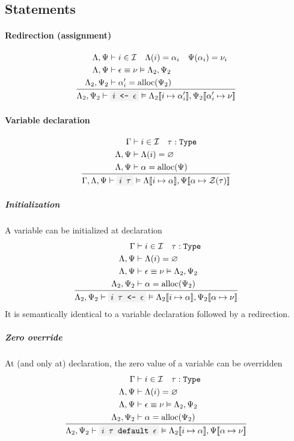 \documentclass[11pt]{report}
\newcommand{\oprule}[3][gathered]{\frac{\begin{#1}#2\end{#1}}{\begin{gathered}#3\end{gathered}}}
\newcommand{\then}{\vdash}
\newcommand{\Then}{\vDash}
\newcommand{\code}[1]{\texttt{\colorbox{gray!10}{#1}}}
\newcommand{\alloc}{\mathrm{alloc}}
\newcommand{\addr}{\alpha}
\newcommand{\expr}{\epsilon}
\newcommand{\val}{\nu}
\newcommand{\Id}{\mathcal{I}}
\newcommand{\Zero}{\mathcal{Z}}
\newcommand{\Type}{\texttt{Type}}
\newcommand{\env}[1]{[\![#1]\!]}
\newcommand{\Env}{\Gamma}
\newcommand{\EnvLoc}{\Lambda}
\newcommand{\EnvStore}{\Psi}
\theoremstyle{definition}
\begin{document}
\subsection{Statements}

\paragraph{Redirection (assignment)}

\[
	\oprule[aligned]{
		\EnvLoc,\EnvStore     &\then i \in \Id \quad \EnvLoc(i) = \addr_i \quad \EnvStore(\addr_i) = \val_i \\*
		\EnvLoc,\EnvStore     &\then \expr \equiv \val \Then \EnvLoc_2,\EnvStore_2 \\*
		\EnvLoc_2,\EnvStore_2 &\then \addr_i' = \alloc(\EnvStore_2) \\*
	}{
		\EnvLoc_2,\EnvStore_2\then \code{$i$ <- $\expr$} \Then \EnvLoc_2\env{i \mapsto \addr_i'},\EnvStore_2\env{\addr_i' \mapsto \val}
	}
\]

\paragraph{Variable declaration}

\[
	\oprule[aligned]{
		\Env            &\then i \in \Id \quad \tau : \Type \\*
		\EnvLoc,\EnvStore &\then \EnvLoc(i) = \varnothing \\*
		\EnvLoc,\EnvStore &\then \addr = \alloc(\EnvStore)
	}{
		\Env,\EnvLoc,\EnvStore \then \code{$i$ $\tau$}
		\Then \EnvLoc\env{i \mapsto \addr},\EnvStore\env{\addr \mapsto \Zero(\tau)}
	}
\]

\subparagraph{Initialization} A variable can be initialized at declaration
\[
	\oprule[aligned]{
		\Env                  &\then i \in \Id \quad \tau : \Type \\*
		\EnvLoc,\EnvStore     &\then \EnvLoc(i) = \varnothing \\*
		\EnvLoc,\EnvStore     &\then \expr \equiv \val \Then \EnvLoc_2,\EnvStore_2 \\*
		\EnvLoc_2,\EnvStore_2 &\then \addr = \alloc(\EnvStore_2) \\*
	}{
		\EnvLoc_2,\EnvStore_2 \then \code{$i$ $\tau$ <- $\expr$}
		\Then \EnvLoc_2\env{i \mapsto \addr},\EnvStore_2\env{\addr \mapsto \val}
	}
\]
It is semantically identical to a variable declaration followed by a
redirection.


\subparagraph{Zero override} At (and only at) declaration, the zero value of a
variable can be overridden
\[
	\oprule[aligned]{
		\Env                  &\then i \in \Id \quad \tau : \Type \\*
		\EnvLoc,\EnvStore     &\then \EnvLoc(i) = \varnothing \\*
		\EnvLoc,\EnvStore     &\then \expr \equiv \val \Then \EnvLoc_2,\EnvStore_2 \\*
		\EnvLoc_2,\EnvStore_2 &\then \addr = \alloc(\EnvStore_2) \\*
	}{
		\EnvLoc_2,\EnvStore_2 \then \code{$i$ $\tau$ default $\expr$}
		\Then \EnvLoc_2\env{i \mapsto \addr},\EnvStore\env{\addr \mapsto \val}
	}
\]
\end{document}
